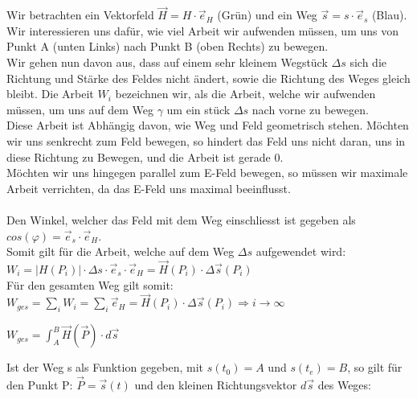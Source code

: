 \iend
{}
\beginip
Wir betrachten ein Vektorfeld $\vec{H} = H \cdot \vec{e}_H$  (Grün) und ein Weg $\vec{s} = s \cdot \vec{e}_s$ (Blau). \\
Wir interessieren uns dafür, wie viel Arbeit wir aufwenden müssen, um uns von Punkt A (unten Links) nach Punkt B (oben Rechts) zu bewegen. \\
Wir gehen nun davon aus, dass auf einem sehr kleinem Wegstück $\Delta s$ sich die Richtung und Stärke des Feldes nicht ändert, sowie die Richtung des Weges gleich bleibt.
Die Arbeit $W_i$ bezeichnen wir, als die Arbeit, welche wir aufwenden müssen, um uns auf dem Weg $\gamma$ um ein stück $\Delta s$ nach vorne zu bewegen. \\
Diese Arbeit ist Abhängig davon, wie Weg und Feld geometrisch stehen. Möchten wir uns senkrecht zum Feld bewegen, so hindert das Feld uns nicht daran, uns in diese Richtung zu Bewegen, und die  Arbeit ist gerade 0. \\
Möchten wir uns hingegen parallel zum E-Feld bewegen, so müssen wir maximale Arbeit verrichten, da das E-Feld uns maximal beeinflusst. \\
\\
Den Winkel, welcher das Feld mit dem Weg einschliesst ist gegeben als $ cos(\varphi) = \vec{e}_s \cdot \vec{e}_H$. \\
Somit gilt für die Arbeit, welche auf dem Weg $\Delta s$ aufgewendet wird: $W_i = |H(P_i)| \cdot \Delta s \cdot  \vec{e}_s \cdot \vec{e}_H = \vec{H}(P_i) \cdot \Delta \vec{s}(P_i)$ \\
Für den gesamten Weg gilt somit:
$\displaystyle W_{ges} = \sum_i W_i = \sum_i \vec{e}_H = \vec{H}(P_i) \cdot \Delta \vec{s}(P_i) \Rightarrow i\rightarrow \infty $

\begin{center}
	$ W_{ges} = \int_A^B \vec{H}(\vec{P})\cdot d\vec{s} $
\end{center}
Ist der Weg s als Funktion gegeben, mit $s(t_0) = A $ und $s(t_e) = B$, so gilt für den Punkt P: $\vec{P} = \vec{s}(t)$ und den kleinen Richtungsvektor $ d\vec{s}$  des Weges: \\


